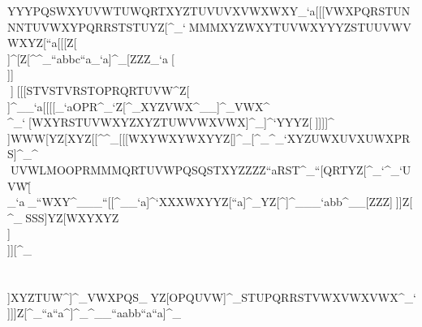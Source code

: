              YYYPQSWXYUVWTUWQRTXYZTUVUVXVWXWXY_`a                                                            [[[VWXPQRSTUNNNTUVWXYPQRRSTSTUYZ[^_`                                                            ^^^MMMXYZWXYTUVWXYYYZSTUUVWVWXYZ[``a                                                            [[[Z[\\]^[\]Z[\^^_``abbc``a_`a]^_[\]                                                            ZZZ_`a^^_[\]\\]]^^\\\[\]]^^[\]\]]^^_                                                            [[[STVSTVRSTOPRQRTUVW\]^Z[\[\]]^__`a                                                            [[[[\]_`aOPR^_`Z[\YZ[OPRYZ[STUQST\]^                                                            \\\MNPWXYYZ[RSUNNNMMMPPPUVWPRSPRSWXZ                                                            ZZZ__`[\]TUVXY[]^_XYZVWX^__]^_VWX\]^                                                            \\\TUVTUVSTUPPPOPQRSULLLRSTKKKSTU^_`                                                            ^^^[\]WXYRSTUVWXYZXYZTUWVWXVWX]^_]^`                                                            YYYZ[\TUVVWXZ[\[\]YZ[YZ[YZ[[\]Z[\Z[\                                                            YYY__`]^^\]]]]^\\]WWW[\]YZ[XYZ[[\^^_                                                            [[[WXYWXYWXYYZ[]^_[\][\]__`__`[\]^_`                                                            \\\[\][\]]^_^_`XYZUWXUVXUWXPRS]^_\]^                                                            \\\STV^^_UVWLMOOPRMMMQRTUVWPQSQSTXYZ                                                            ZZZ``aRST\]^_``[\]QRTYZ[^_`^_`UVW[\^                                                            \\\VWYRSURSTXYZWXYRSTPQRTUVPQRSTU_`a                                                            ^^^_``WXY^___``[[\STVYZ[WXY]^__`a]^`                                                            XXXWXYYZ[``a]^_YZ[\]^]^___`abb^__[\]                                                            ZZZ]^^\]]Z[\]^_^^_SSS\]]YZ[WXYXYZ\\]                                                            \\\XYZWXYWXY[\][\]UVW__```a[\]_``^_`                                                            ]]][\][\]VWXZ[\XYZ\]^YZ[TVWXYZQRT]^_                                                            \\\STUMMMGGGJJJVWXQRTTUVTUVOPROPRYZ\                                                            \\\RSUQRTXYZ\\]XYZTUW\]^]^_VWXPQS\]_                                                            ^^^YZ[OPQUVW]^_STUPQRRSTVWXVWXVWX^_`                                                            ]]]Z[\TUV[\][\]WXY\]^[\]UVXZ[\WXZ^_`                                                            ZZZ]^_``a``a\]^]^_^__``aabb``a``a]^_                               